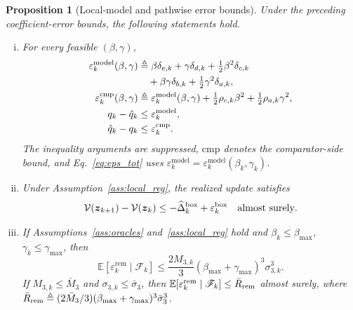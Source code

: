 \documentclass[journal]{IEEEtran}
\newtheorem{proposition}{Proposition}
\theoremstyle{remark}
\newcommand{\E}{\mathbb{E}}
\newcommand{\bz}{\boldsymbol{z}}
\newcommand{\Vk}{\mathcal{V}}
\begin{document}
	\begin{proposition}[Local-model and pathwise error bounds]\label{prop:model_approx}
		Under the preceding coefficient-error bounds, the following statements hold.
		\begin{enumerate}[(i)]
			\item For every feasible $(\beta,\gamma)$,
			\begin{equation}\label{eq:eps_model_bound}
				\begin{aligned}
					\varepsilon_k^{\rm model}(\beta,\gamma)
					&\triangleq\beta\delta_{e,k}+\gamma\delta_{d,k}
					+\tfrac12\beta^2\delta_{c,k}\\
					&\quad+\beta\gamma\delta_{b,k}+\tfrac12\gamma^2\delta_{a,k},\\
					\varepsilon_k^{\rm cmp}(\beta,\gamma)
					&\triangleq\varepsilon_k^{\rm model}(\beta,\gamma)
					+\tfrac12\rho_{c,k}\beta^2+\tfrac12\rho_{a,k}\gamma^2,\\
					q_k-\hat q_k&\le\varepsilon_k^{\rm model},\\
					\hat q_k-q_k&\le\varepsilon_k^{\rm cmp}.
				\end{aligned}
			\end{equation}
			The inequality arguments are suppressed, $\mathrm{cmp}$ denotes the comparator-side bound, and Eq.~\eqref{eq:eps_tot} uses $\varepsilon_k^{\mathrm{model}}=\varepsilon_k^{\mathrm{model}}(\beta_k,\gamma_k)$.
			\item Under Assumption~\ref{ass:local_reg}, the realized update satisfies
			\begin{equation}\label{eq:pathwise_drift}
				\Vk(\bz_{k+1})-\Vk(\bz_{k})
				\le -\widehat\Delta_{k}^{\rm box}+\varepsilon_{k}^{\rm box}
				\quad\text{almost surely}.
			\end{equation}
			\item If Assumptions~\ref{ass:oracles} and~\ref{ass:local_reg} hold and $\beta_{k}\le\beta_{\max}$, $\gamma_{k}\le\gamma_{\max}$, then
			\begin{equation}\label{eq:eps_rem_cond}
				\E[\varepsilon_{k}^{\mathrm{rem}}\mid\mathscr{F}_{k}]
				\le
				\frac{2M_{3,k}}{3}(\beta_{\max}+\gamma_{\max})^{3}\sigma_{3,k}^{3}.
			\end{equation}
			If $M_{3,k}\le\bar M_{3}$ and $\sigma_{3,k}\le\bar\sigma_{3}$, then $\E[\varepsilon_{k}^{\mathrm{rem}}\mid\mathscr F_k]\le\bar R_{\rm rem}$ almost surely, where $\bar R_{\rm rem}\triangleq(2\bar M_3/3)(\beta_{\max}+\gamma_{\max})^3\bar\sigma_3^3$.
		\end{enumerate}
	\end{proposition}
	
\end{document}
